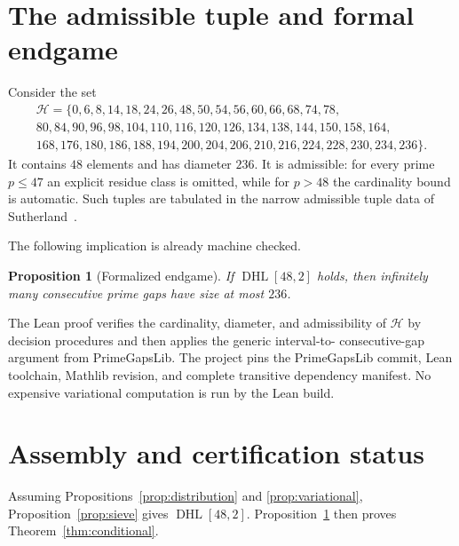 \documentclass[11pt]{amsart}
\newtheorem{proposition}[theorem]{Proposition}
\theoremstyle{definition}
\newcommand{\DHL}{\operatorname{DHL}}
\begin{document}
\section{The admissible tuple and formal endgame}\label{sec:endgame}

Consider the set
\begin{multline*}
\mathcal H=\{0,6,8,14,18,24,26,48,50,54,56,60,66,68,74,78,\\
80,84,90,96,98,104,110,116,120,126,134,138,144,150,158,164,\\
168,176,180,186,188,194,200,204,206,210,216,224,228,230,234,236\}.
\end{multline*}
It contains $48$ elements and has diameter $236$.  It is admissible: for every
prime $p\leq47$ an explicit residue class is omitted, while for $p>48$ the
cardinality bound is automatic.  Such tuples are tabulated in the narrow
admissible tuple data of Sutherland~\cite{Sutherland}.

The following implication is already machine checked.

\begin{proposition}[Formalized endgame]\label{prop:endgame}
If $\DHL[48,2]$ holds, then infinitely many consecutive prime gaps have size at
most $236$.
\end{proposition}

The Lean proof verifies the cardinality, diameter, and admissibility of
$\mathcal H$ by decision procedures and then applies the generic interval-to-
consecutive-gap argument from PrimeGapsLib.  The project pins the PrimeGapsLib
commit, Lean toolchain, Mathlib revision, and complete transitive dependency
manifest.  No expensive variational computation is run by the Lean build.

\section{Assembly and certification status}\label{sec:assembly}

Assuming Propositions~\ref{prop:distribution} and
\ref{prop:variational}, Proposition~\ref{prop:sieve} gives
$\DHL[48,2]$.  Proposition~\ref{prop:endgame} then proves
Theorem~\ref{thm:conditional}.
\end{document}
